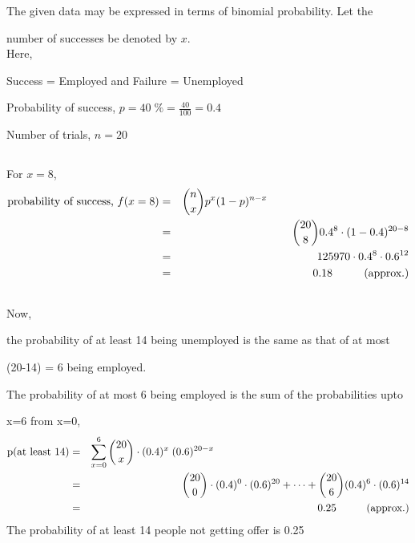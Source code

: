 \documentclass{article}
\begin{document}
\Large{
    \hspace{1.5em}The given data may be expressed in terms of binomial probability. Let the 

    \hspace{1.56em}number of successes be denoted by $x$. \\

    \hspace{1.5em}Here,

    \hspace{1.5em}Success = Employed and Failure = Unemployed

    \hspace{1.5em}Probability of success, $ p = 40\;\% = \frac{40}{100} = 0.4$

    \hspace{1.5em}Number of trials, $n = 20$

    \subsection{}
    For $x=8$,
    \begin{eqnarray*}
        \text{probability of success, } f(x=8)  &=& {n \choose x} p^x (1-p)^{n-x}\hspace{4.5cm}\\
        &=& {20 \choose 8} 0.4^8\cdot (1-0.4)^{20-8}\\
        &=& 125970\cdot 0.4^8 \cdot 0.6^{12}\\
        &=& 0.18 \hspace{1cm}\text{(approx.)}
    \end{eqnarray*}

    \subsection{}
    Now,

    \hspace{1.5em}the probability of at least 14 being unemployed is the same as that of at most

    \hspace{1.5em}(20-14) = 6 being employed.

    \hspace{1.5em}The probability of at most 6 being employed is the sum of the probabilities upto

    \hspace{1.5em}x=6 from x=0,
    \begin{eqnarray*}
        \text{p(at least 14)} &=& \sum_{x=0}^6 {20 \choose x} \cdot (0.4)^x \; (0.6)^{20-x}\hspace{6.5cm}\\
        &=& {20 \choose 0} \cdot (0.4)^0\cdot(0.6)^{20} + \dots + {20 \choose 6} (0.4)^6\cdot (0.6)^{14}\\
        &=& 0.25\hspace{1cm}\text{(approx.)}
    \end{eqnarray*}
    \hspace{1.5em}The probability of at least 14 people not getting offer is 0.25


}
\newpage
\end{document}
